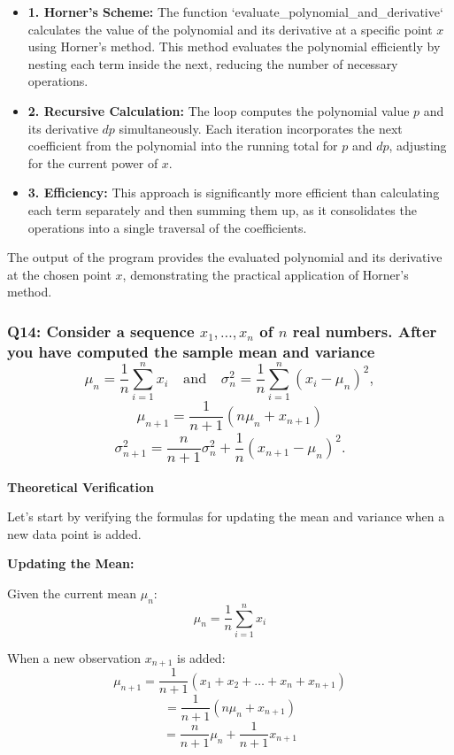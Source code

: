 \documentclass{article}
\begin{document}
\begin{itemize}
    \item \textbf{1. Horner's Scheme:} The function `evaluate\_polynomial\_and\_derivative` calculates the value of the polynomial and its derivative at a specific point \(x\) using Horner's method. This method evaluates the polynomial efficiently by nesting each term inside the next, reducing the number of necessary operations.
    \item \textbf{2. Recursive Calculation:} The loop computes the polynomial value \(p\) and its derivative \(dp\) simultaneously. Each iteration incorporates the next coefficient from the polynomial into the running total for \(p\) and \(dp\), adjusting for the current power of \(x\).
    \item \textbf{3. Efficiency:} This approach is significantly more efficient than calculating each term separately and then summing them up, as it consolidates the operations into a single traversal of the coefficients.
\end{itemize}

The output of the program provides the evaluated polynomial and its derivative at the chosen point \(x\), demonstrating the practical application of Horner's method.

\subsubsection*{Q14: Consider a sequence \(x_1, \ldots, x_n\) of \(n\) real numbers. After you have computed the sample mean and variance
\[ \mu_n = \frac{1}{n} \sum_{i=1}^n x_i \quad \text{and} \quad \sigma_n^2 = \frac{1}{n} \sum_{i=1}^n (x_i - \mu_n)^2, \]
\[ \mu_{n+1} = \frac{1}{n+1} (n\mu_n + x_{n+1}) \]
\[ \sigma_{n+1}^2 = \frac{n}{n+1} \sigma_n^2 + \frac{1}{n} (x_{n+1} - \mu_n)^2. \]}

\textbf{Theoretical Verification}

Let's start by verifying the formulas for updating the mean and variance when a new data point is added.

\textbf{Updating the Mean:}

Given the current mean \(\mu_n\):
\[ \mu_n = \frac{1}{n} \sum_{i=1}^n x_i \]

When a new observation \(x_{n+1}\) is added:
\[ \mu_{n+1} = \frac{1}{n+1} (x_1 + x_2 + \ldots + x_n + x_{n+1}) \]
\[ = \frac{1}{n+1} \left( n\mu_n + x_{n+1} \right) \]
\[ = \frac{n}{n+1} \mu_n + \frac{1}{n+1} x_{n+1} \]
\end{document}

